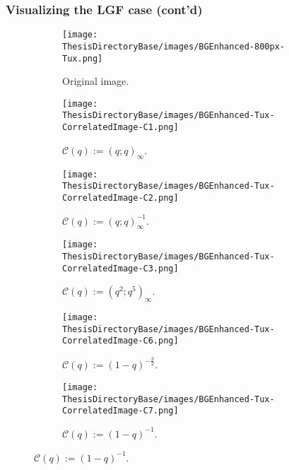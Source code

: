 \begin{frame}
\frametitle{Visualizing the LGF case (cont'd)}

\begin{figure}[ht!]
  
  \vspace*{-0.075in}
  \centering
  \begin{subfigure}[t]{.3\linewidth}
    \centering\texttt{[image: \\ThesisDirectoryBase/images/BGEnhanced-800px-Tux.png]}
    \caption{Original image.}
  \end{subfigure}
  \begin{subfigure}[t]{.3\linewidth}
    \centering\texttt{[image: \\ThesisDirectoryBase/images/BGEnhanced-Tux-CorrelatedImage-C1.png]}
    \caption{$\mathcal{C}(q) := (q; q)_{\infty}$.}
  \end{subfigure}
  \begin{subfigure}[t]{.3\linewidth}
    \centering\texttt{[image: \\ThesisDirectoryBase/images/BGEnhanced-Tux-CorrelatedImage-C2.png]}
       \caption{$\mathcal{C}(q) := (q; q)_{\infty}^{-1}$.}
  \end{subfigure}
  \begin{subfigure}[t]{.3\linewidth}
    \centering\texttt{[image: \\ThesisDirectoryBase/images/BGEnhanced-Tux-CorrelatedImage-C3.png]}
    \caption{$\mathcal{C}(q) := (q^2; q^5)_{\infty}$.}
  \end{subfigure}
  \begin{subfigure}[t]{.3\linewidth}
    \centering\texttt{[image: \\ThesisDirectoryBase/images/BGEnhanced-Tux-CorrelatedImage-C6.png]}
    \caption{$\mathcal{C}(q) := (1-q)^{-\frac{3}{2}}$.}
  \end{subfigure}
  \begin{subfigure}[t]{.3\linewidth}
    \centering\texttt{[image: \\ThesisDirectoryBase/images/BGEnhanced-Tux-CorrelatedImage-C7.png]}
       \caption{$\mathcal{C}(q) := (1-q)^{-1}$.}
  \end{subfigure}

\end{figure}

\end{frame}

